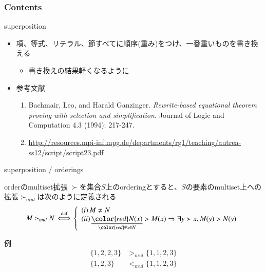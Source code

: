 \documentclass[dvipdfmx,11pt,notheorems]{beamer}
\theoremstyle{definition}
\newcommand{\defines}{\ensuremath{\overset{\text{def}}{\,\Longleftrightarrow\,}}}
\newcommand{\underred}[2]{\underset{\color{red} #1}{\underline{\color{red} #2}}}
\begin{document}
\begin{frame}\frametitle{Contents}
\tableofcontents[currentsection]
\end{frame}
\begin{frame}{superposition}
  \begin{itemize}
    \item 項、等式、リテラル、節すべてに順序(重み)をつけ、一番重いものを書き換える
    \begin{itemize}
      \item 書き換えの結果軽くなるように
    \end{itemize}
    \item 参考文献
    \begin{enumerate}
      \item Bachmair, Leo, and Harald Ganzinger. \textit{Rewrite-based equational theorem proving with selection and simplification.} Journal of Logic and Computation 4.3 (1994): 217-247.
      \item \url{http://resources.mpi-inf.mpg.de/departments/rg1/teaching/autrea-ss12/script/script23.pdf}
    \end{enumerate}
  \end{itemize}
\end{frame}

\begin{frame}{superposition / orderings}
  \begin{block}{orderのmultiset拡張}
    $\succ$を集合$S$上のorderingとすると、$S$の要素のmultiset上への拡張$\succ_{mul}$は次のように定義される
    \vspace{-10pt}
    \[
    M \succ_{mul} N \defines
    \left\{\begin{array}{l}
    (i) \, M \not= N \\
    (ii) \, \underred{\# x \in N}{N(x)} > M(x) \Rightarrow \exists y \succ x.\, M(y) > N(y) \\
    \end{array}
    \right.
    \]
  \end{block}

  \begin{exampleblock}{例}
    \vspace{-10pt}
    \begin{align*}
      \{1, 2, 2, 3\} &>_{mul} \{1, 1, 2, 3\} \\
      \{1, 2, 3\} &<_{mul} \{1, 1, 2, 3\}
    \end{align*}
  \end{exampleblock}
\end{frame}
\end{document}
